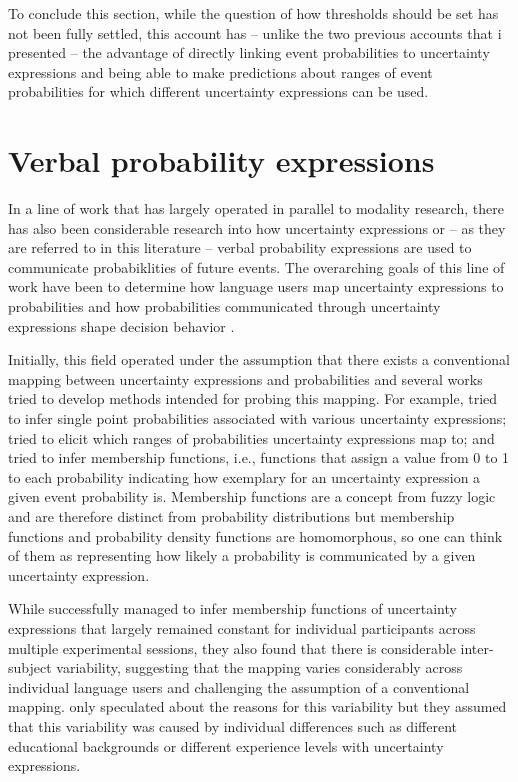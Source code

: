 To conclude this section, while the question of how thresholds should be set has not been fully settled, this account has -- unlike the two previous accounts that i presented 
--  the advantage of directly linking event probabilities to uncertainty expressions and being able to make predictions about ranges of event probabilities for which different
uncertainty expressions can be used.

\section{Verbal probability expressions}

In a line of work that has largely operated in parallel to modality research, there has also been considerable research 
into how uncertainty expressions or -- as they are referred to in this literature -- verbal probability expressions are used
to communicate probabiklities of future events. The overarching goals of this line of work have been to determine how
language users map uncertainty expressions to probabilities and how probabilities communicated through uncertainty expressions
shape decision behavior \cite{BudescuWallsten1995}. 

Initially, this field operated under the assumption that there exists a conventional mapping between uncertainty expressions
and probabilities and several works tried to develop methods intended for probing this mapping. For example, \cite{BethMarom1982} 
tried to infer single point probabilities associated with various uncertainty expressions; \cite{Hamm1991} tried to elicit which ranges of
probabilities uncertainty expressions map to; and \cite{WallstenBudescuRapoportetal.1986} tried to infer membership functions, i.e., 
functions that assign a value from 0 to 1 to each probability indicating how exemplary for an uncertainty expression a given
event probability is. Membership functions are a concept from fuzzy logic and are therefore distinct from probability distributions but 
 membership functions and probability density functions are homomorphous, so one can think of them as representing how likely a 
probability is communicated by a given uncertainty expression.

While \cite{WallstenBudescuRapoportetal1986} successfully managed to infer membership functions of uncertainty expressions
that largely remained constant for individual participants across multiple experimental sessions, they also found that there is considerable
inter-subject variability, suggesting that the mapping varies considerably across individual language users and challenging
the assumption of a conventional mapping. \cite{WallstenBudescuRapoportetal1986} only speculated about the reasons 
for this variability but they assumed that this variability was caused by individual differences such as different educational backgrounds
or different experience levels with uncertainty expressions.

